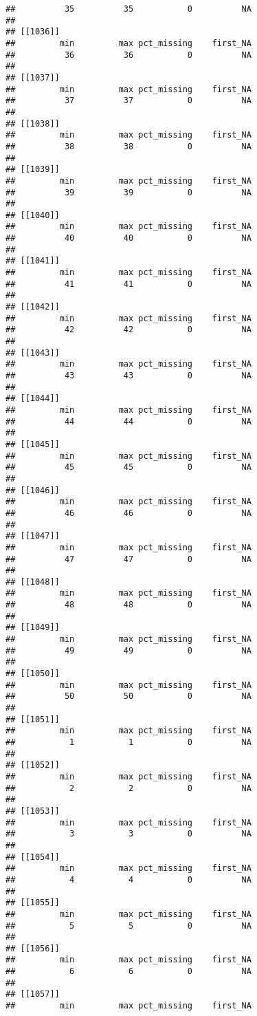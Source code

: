 \documentclass[
]{article}
\begin{document}
\begin{verbatim}
##          35          35           0          NA 
## 
## [[1036]]
##         min         max pct_missing    first_NA 
##          36          36           0          NA 
## 
## [[1037]]
##         min         max pct_missing    first_NA 
##          37          37           0          NA 
## 
## [[1038]]
##         min         max pct_missing    first_NA 
##          38          38           0          NA 
## 
## [[1039]]
##         min         max pct_missing    first_NA 
##          39          39           0          NA 
## 
## [[1040]]
##         min         max pct_missing    first_NA 
##          40          40           0          NA 
## 
## [[1041]]
##         min         max pct_missing    first_NA 
##          41          41           0          NA 
## 
## [[1042]]
##         min         max pct_missing    first_NA 
##          42          42           0          NA 
## 
## [[1043]]
##         min         max pct_missing    first_NA 
##          43          43           0          NA 
## 
## [[1044]]
##         min         max pct_missing    first_NA 
##          44          44           0          NA 
## 
## [[1045]]
##         min         max pct_missing    first_NA 
##          45          45           0          NA 
## 
## [[1046]]
##         min         max pct_missing    first_NA 
##          46          46           0          NA 
## 
## [[1047]]
##         min         max pct_missing    first_NA 
##          47          47           0          NA 
## 
## [[1048]]
##         min         max pct_missing    first_NA 
##          48          48           0          NA 
## 
## [[1049]]
##         min         max pct_missing    first_NA 
##          49          49           0          NA 
## 
## [[1050]]
##         min         max pct_missing    first_NA 
##          50          50           0          NA 
## 
## [[1051]]
##         min         max pct_missing    first_NA 
##           1           1           0          NA 
## 
## [[1052]]
##         min         max pct_missing    first_NA 
##           2           2           0          NA 
## 
## [[1053]]
##         min         max pct_missing    first_NA 
##           3           3           0          NA 
## 
## [[1054]]
##         min         max pct_missing    first_NA 
##           4           4           0          NA 
## 
## [[1055]]
##         min         max pct_missing    first_NA 
##           5           5           0          NA 
## 
## [[1056]]
##         min         max pct_missing    first_NA 
##           6           6           0          NA 
## 
## [[1057]]
##         min         max pct_missing    first_NA 

\end{verbatim}
\end{document}
